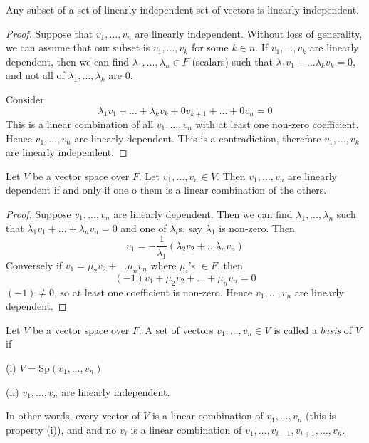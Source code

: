 \documentclass[10pt]{scrartcl}
\begin{document}
\begin{proposition}
Any subset of a set of linearly independent set of vectors is linearly independent.	
\end{proposition}
\begin{proof}
Suppose that $v_1,\dots,v_n$ are linearly independent. Without loss of generality, we can assume that our subset is $v_1,\dots,v_k$ for some $k \in n$. If $v_1,\dots,v_k$ are linearly dependent, then we can find $\lambda_1,\dots,\lambda_n \in F$ (scalars) such that $\lambda_1v_1 + \dots \lambda_kv_k = 0$, and not all of $\lambda_1,\dots,\lambda_k$ are $0$. 

Consider
\[
  \lambda_1v_1 + \dots + \lambda_kv_k + 0v_{k+1} + \dots + 0v_n = 0
\]
This is a linear combination of all $v_1,\dots,v_n$ with at least one non-zero coefficient. Hence $v_1,\dots,v_n$ are linearly dependent. This is a contradiction, therefore $v_1,\dots,v_k$ are linearly independent.
\end{proof}\vsp

\begin{proposition}
	Let $V$ be a vector space over $F$. Let $v_1,\dots,v_n \in V$. Then $v_1,\dots,v_n$ are linearly dependent if and only if one o them is a linear combination of the others.
\end{proposition}

\begin{proof}
Suppose $v_1,\dots,v_n$ are linearly dependent. Then we can find $\lambda_1,\dots,\lambda_n$ such that $\lambda_1v_1 + \dots + \lambda_nv_n = 0$ and one of $\lambda_i$s, say $\lambda_1$ is non-zero. Then 
\[
  v_1 = -\frac{1}{\lambda_1}(\lambda_2v_2 + \dots \lambda_nv_n)
\]
Conversely if $v_1 = \mu_2v_2 + \dots \mu_nv_n$ where $\mu_i$'s $\in F$, then 
\[
  (-1)v_1 + \mu_2v_2 + \dots + \mu_nv_n = 0
\]
$(-1) \neq 0$, so at least one coefficient is non-zero. Hence $v_1,\dots,v_n$ are linearly dependent. 
\end{proof}\vsp


\begin{definition}
Let $V$ be a vector space over $F$. A set of vectors $v_1,\dots,v_n \in V$ is called a \emph{basis} of $V$ if 

(i) $V = \mathrm{Sp}(v_1,\dots,v_n)$

(ii) $v_1,\dots,v_n$ are linearly independent.
\end{definition}

In other words, every vector of $V$ is a linear combination of $v_1,\dots,v_n$ (this is property (i)), and and no $v_i$ is a linear combination of $v_1,\dots,v_{i-1},v_{i+1},\dots,v_n$. \\
\end{document}
